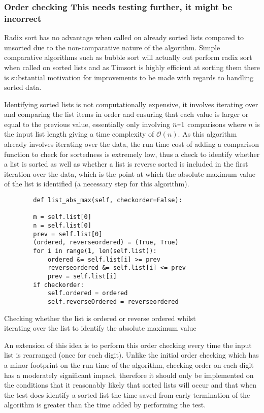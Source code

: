 \documentclass[12pt]{article}
\newcommand{\minus}{\scalebox{0.75}[1.0]{$-$}}
\begin{document}
\subsubsection{Order checking {\color{red} This needs testing further, it might be incorrect}}
\par
Radix sort has no advantage when called on already sorted lists compared to unsorted due to the non-comparative nature of the algorithm. Simple comparative algorithms such as bubble sort will actually out perform radix sort when called on sorted lists and as Timsort is highly efficient at sorting them there is substantial motivation for improvements to be made with regards to handling sorted data.
\par
Identifying sorted lists is not computationally expensive, it involves iterating over and comparing the list items in order and ensuring that each value is larger or equal to the previous value, essentially only involving $n\minus1$ comparisons where $n$ is the input list length giving a time complexity of $\mathcal{O}(n)$. As this algorithm already involves iterating over the data, the run time cost of adding a comparison function to check for sortedness is extremely low, thus a check to identify whether a list is sorted as well as whether a list is reverse sorted is included in the first iteration over the data, which is the point at which the absolute maximum value of the list is identified (a necessary step for this algorithm).
\begin{table}[H]
	\centering
	\begin{lstlisting}
		def list_abs_max(self, checkorder=False):
	
		m = self.list[0]
		n = self.list[0]
		prev = self.list[0]
		(ordered, reverseordered) = (True, True)
		for i in range(1, len(self.list)):
			ordered &= self.list[i] >= prev
			reverseordered &= self.list[i] <= prev
			prev = self.list[i]
		if checkorder:
			self.ordered = ordered
			self.reverseOrdered = reverseordered
	\end{lstlisting}
	\caption*{Checking whether the list is ordered or reverse ordered whilst\\ iterating over the list to identify the absolute maximum value}
\end{table}
\par
An extension of this idea is to perform this order checking every time the input list is rearranged (once for each digit). Unlike the initial order checking which has a minor footprint on the run time of the algorithm, checking order on each digit has a moderately significant impact, therefore it should only be implemented on the conditions that it reasonably likely that sorted lists will occur and that when the test does identify a sorted list the time saved from early termination of the algorithm is greater than the time added by performing the test. 
\end{document}
